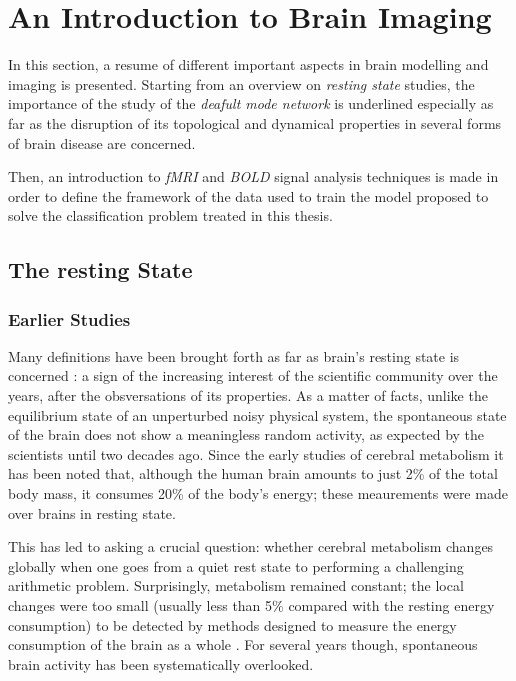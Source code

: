 \documentclass[12pt,openright,twoside,a4paper]{book}
\begin{document}
\mainmatter

\chapter{An Introduction to Brain Imaging}

In this section, a resume of different important aspects in brain modelling and imaging is presented.
Starting from an overview on \textit{resting state} studies, the importance of the study of the \textit{deafult mode network} is underlined especially as far as the disruption of its topological and dynamical properties in several forms of brain disease are concerned.

Then, an introduction to \textit{fMRI} and \textit{BOLD} signal analysis techniques is made in order to define the framework of the data used to train the model proposed to solve the classification problem treated in this thesis. 

\section{The resting State}

\subsection{Earlier Studies}

Many definitions have been brought forth as far as brain's resting state is concerned \cite{RNS}: a sign of the increasing interest of the scientific community over the years, after the obsversations of its properties.
As a matter of facts, unlike the equilibrium state of an unperturbed noisy physical system, the spontaneous state of the brain does not show a meaningless random activity, as expected by the scientists until two decades ago.
Since the early studies of cerebral metabolism it has been noted that, although the human brain amounts to just 2\% of the total body mass, it consumes 20\% of the body's energy; these meaurements were made over brains in resting state.

This has led to asking a crucial question: whether cerebral metabolism changes globally when one goes from a quiet rest state to performing a challenging arithmetic problem. 
Surprisingly, metabolism remained constant; the local changes were too small (usually less than 5\% compared with the resting energy consumption) to be detected by methods designed to measure the energy consumption of the brain as a whole \cite{Neuro-Hist}.
For several years though, spontaneous brain activity has been systematically overlooked.
\end{document}
